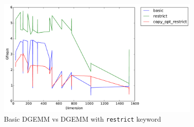 \documentclass[11pt]{article}
\begin{document}
\begin{figure}[H]
    \includegraphics[width=0.9\textwidth]{timing_copy_opt_restrict.pdf}
    \caption{Basic DGEMM vs DGEMM with \texttt{restrict} keyword}
    \label{restrict_copy_opt}
\end{figure} 
\end{document}
